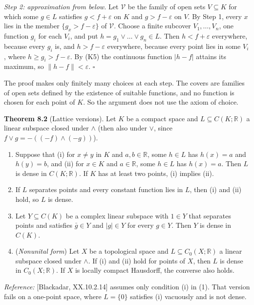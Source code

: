 \documentclass[
  english,
  11pt,
  a4paper,
]{article}
\providecommand{\tightlist}{%
  \setlength{\itemsep}{0pt}\setlength{\parskip}{0pt}}
\begin{document}
\emph{Step 2: approximation from below.} Let \(\mathcal V\) be the
family of open sets \(V\subseteq K\) for which some \(g\in L\) satisfies
\(g<f+\varepsilon\) on \(K\) and \(g>f-\varepsilon\) on \(V\). By Step
1, every \(x\) lies in the member \(\{g_x>f-\varepsilon\}\) of
\(\mathcal V\). Choose a finite subcover \(V_1,\dots,V_n\), one function
\(g_i\) for each \(V_i\), and put \(h=g_1\vee\dots\vee g_n\in L\). Then
\(h<f+\varepsilon\) everywhere, because every \(g_i\) is, and
\(h>f-\varepsilon\) everywhere, because every point lies in some
\(V_i\), where \(h\geq g_i>f-\varepsilon\). By (K5) the continuous
function \(|h-f|\) attains its maximum, so \(\|h-f\|<\varepsilon\).
\(\square\)

The proof makes only finitely many choices at each step. The covers are
families of open sets defined by the existence of suitable functions,
and no function is chosen for each point of \(K\). So the argument does
not use the axiom of choice.

\textbf{Theorem 8.2} (Lattice versions). Let \(K\) be a compact space
and \(L\subseteq C(K;\mathbb R)\) a linear subspace closed under
\(\wedge\) (then also under \(\vee\), since
\(f\vee g=-((-f)\wedge(-g))\)).

\begin{enumerate}
\tightlist
\item
  Suppose that (i) for \(x\neq y\) in \(K\) and \(a,b\in\mathbb R\),
  some \(h\in L\) has \(h(x)=a\) and \(h(y)=b\), and (ii) for \(x\in K\)
  and \(a\in\mathbb R\), some \(h\in L\) has \(h(x)=a\). Then \(L\) is
  dense in \(C(K;\mathbb R)\). If \(K\) has at least two points, (i)
  implies (ii).
\item
  If \(L\) separates points and every constant function lies in \(L\),
  then (i) and (ii) hold, so \(L\) is dense.
\item
  Let \(Y\subseteq C(K)\) be a complex linear subspace with \(1\in Y\)
  that separates points and satisfies \(\bar g\in Y\) and \(|g|\in Y\)
  for every \(g\in Y\). Then \(Y\) is dense in \(C(K)\).
\item
  (\emph{Nonunital form}) Let \(X\) be a topological space and
  \(L\subseteq C_0(X;\mathbb R)\) a linear subspace closed under
  \(\wedge\). If (i) and (ii) hold for points of \(X\), then \(L\) is
  dense in \(C_0(X;\mathbb R)\). If \(X\) is locally compact Hausdorff,
  the converse also holds.
\end{enumerate}

\emph{Reference:} {[}Blackadar, XX.10.2.14{]} assumes only condition (i)
in (1). That version fails on a one-point space, where \(L=\{0\}\)
satisfies (i) vacuously and is not dense.
\end{document}
